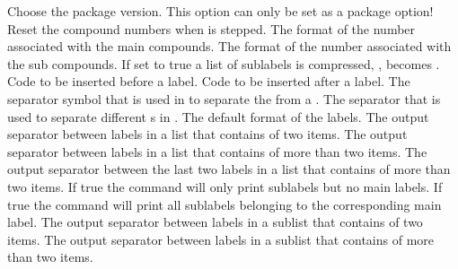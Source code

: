 \documentclass[load-preamble+,babel-options={english,american}]{cnltx-doc}
\newcommand*\ID{\cnltxacronym{ID}{id}}
\begin{document}
\begin{options}
    Choose the package version.  This option can only be set as a package
    option!
    Reset the compound numbers when  is stepped.
    The format of the number associated with the main compounds.
    The format of the number associated with the sub compounds.
    If set to true a list of sublabels is compressed, \ie,
     becomes
    .
  \Default
    Code to be inserted before a label.
  \Default
    Code to be inserted after a label.
    The separator symbol that is used in  to separate the \meta{main
      \ID} from a \meta{sub \ID}.
  \Default{,}
    The separator that is used to separate different \meta{main \ID}s in
    .
    The default format of the labels.
    The output separator between labels in a list that contains of two items.
  \Default{\visualizespaces{, }}
    The output separator between labels in a list that contains of more than
    two items.
    The output separator between the last two labels in a list that contains
    of more than two items.
    If true the command  will only print sublabels but no main
    labels.
    If true the command  will print all sublabels belonging to the
    corresponding main label.
  \Default{,}
    The output separator between labels in a sublist that contains of two
    items.
  \Default{,}
    The output separator between labels in a sublist that contains of more
    than two items.

\end{options}
\end{document}
